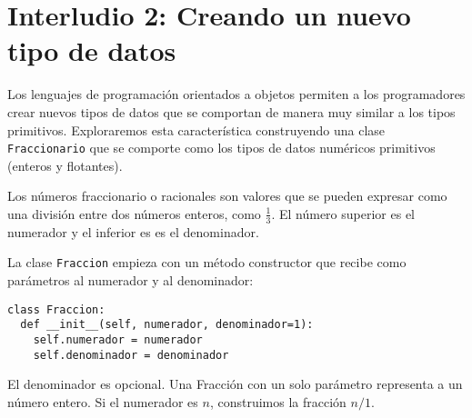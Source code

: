 

%

\chapter{Interludio 2: Creando un nuevo tipo de datos}
\label{overloading}

Los lenguajes de programación orientados a objetos permiten a los
programadores crear nuevos tipos de datos que se comportan de 
manera muy similar a los tipos primitivos. Exploraremos esta 
característica construyendo una clase \texttt{Fraccionario} que
se comporte como los tipos de datos numéricos primitivos (enteros
y flotantes).

Los números fraccionario o racionales son valores que se pueden 
expresar como una división entre dos números enteros, como  $\frac{1}{3}$.  
El número superior es el numerador y el inferior es
es el denominador.


La clase  \texttt{Fraccion} empieza con un método constructor que
recibe como parámetros al numerador y al denominador:


\begin{verbatim}
class Fraccion:
  def __init__(self, numerador, denominador=1):
    self.numerador = numerador
    self.denominador = denominador
\end{verbatim}
%
El denominador es opcional.  Una Fracción con un solo 
parámetro representa a un número entero.  Si el numerador es
$n$, construimos la fracción $n/1$.

